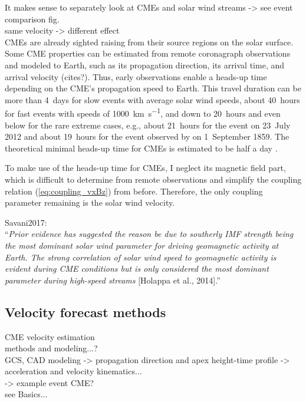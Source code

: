 It makes sense to separately look at CMEs and solar wind streams -> see event comparison fig.\\
same velocity -> different \Kp{} effect\\

CMEs are already sighted raising from their source regions on the solar surface. Some CME properties can be estimated from remote coronagraph observations and modeled to Earth, such as its propagation direction, its arrival time, and arrival velocity (cites?). Thus, early observations enable a heads-up time depending on the CME's propagation speed to Earth. This travel duration can be more than 4~days for slow events with average solar wind speeds, about 40~hours for fast events with speeds of \SI{1000}{\km\per\s}, and down to 20~hours and even below for the rare extreme cases, e.g., about 21~hours for the event on 23~July 2012 \citep{Russell2013,Temmer2015} and about 19~hours for the event observed by \citet{Carrington1859} on 1~September 1859. The theoretical minimal heads-up time for CMEs is estimated to be half a day \citep{Gopalswamy2005}.

To make use of the heads-up time for CMEs, I neglect its magnetic field part, which is difficult to determine from remote observations and simplify the coupling relation (\ref{eq:coupling_vxBz}) from before. Therefore, the only coupling parameter remaining is the solar wind velocity.

Savani2017:\\
``\textit{Prior evidence has suggested the reason be due to southerly IMF strength being the most dominant solar wind parameter for driving geomagnetic activity at Earth. The strong correlation of solar wind speed to geomagnetic activity is evident during CME conditions but is only considered the most dominant parameter during high-speed streams} [Holappa et al., 2014].''\\


\subsection{Velocity forecast methods}

CME velocity estimation\\
methods and modeling...?\\
GCS, CAD modeling -> propagation direction and apex height-time profile -> acceleration and velocity kinematics...\\
-> example event CME?\\
see Basics...\\

